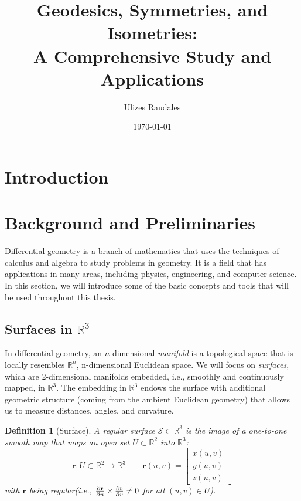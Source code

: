 \documentclass[12pt]{article}
\title{Geodesics, Symmetries, and Isometries:\\A Comprehensive Study and Applications}
\author{Ulizes Raudales}
\date{\today}
\newcommand{\R}{\mathbb{R}}
\newtheorem{definition}{Definition}[section]
\begin{document}
\maketitle

\newpage
\tableofcontents
\newpage

\begin{abstract}
    
\end{abstract}

\section{Introduction}


\section{Background and Preliminaries}

Differential geometry is a branch of mathematics that uses the techniques of calculus and algebra to study problems in geometry. 
It is a field that has applications in many areas, including physics, engineering, and computer science.
In this section, we will introduce some of the basic concepts and tools that will be used throughout this thesis. 

\subsection{Surfaces in \texorpdfstring{$\mathbb{R}^3$}{R3}}\label{sec:surface-def}

In differential geometry, an $n$-dimensional \emph{manifold} is a topological space that is locally resembles $\mathbb{R}^n$, n-dimensional Euclidean space. 
We will focus on \emph{surfaces}, which are 2-dimensional manifolds embedded, i.e., smoothly and continuously mapped, in $\mathbb{R}^3$.
The embedding in $\mathbb{R}^3$ endows the surface with additional geometric structure (coming from the ambient Euclidean geometry) that allows us to measure distances, angles, and curvature.

\begin{definition}[Surface]\label{def:surface}
	A regular surface $\mathcal{S}\subset\R^3$ is the image of a one-to-one smooth map that maps an open set $U\subset\R^{2}$ into $\R^3$:
	\begin{equation}\label{eq:surface-param}		
		\mathbf{r}: U\subset\R^{2}\to\R^3 \qquad \mathbf{r}(u,v) = \begin{bmatrix}
			x(u,v)\\[1ex]
			y(u,v)\\[1ex]
			z(u,v)
		\end{bmatrix}
	\end{equation}
	with $\mathbf{r}$ being regular(i.e., $\pdv{\mathbf{r}}{u} \times \pdv{\mathbf{r}}{v} \neq 0$ for all $(u,v)\in U$).
\end{definition}
\end{document}
